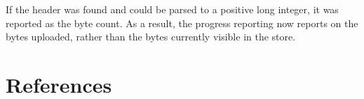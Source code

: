 \documentclass[conference]{IEEEtran}
\begin{document}
If the header was found and could be parsed to a positive long integer, it was reported as the byte count.
As a result, the progress reporting now reports on the bytes uploaded, rather than the bytes currently visible in the store.


\section{References}
\label{sec:references}




\end{document}
